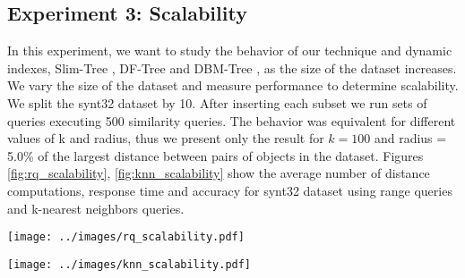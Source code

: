 \subsection{Experiment 3: Scalability}

In this experiment, we want to study the behavior of our technique and dynamic indexes, Slim-Tree \cite{SlimTree}, DF-Tree \cite{dftree} and DBM-Tree \cite{DBMTree}, as the size of the dataset increases. We vary the size of the dataset and measure performance to determine scalability.  We split the synt32 dataset by 10. After inserting each subset we run sets of queries executing 500 similarity queries. The behavior was equivalent for different values of k and radius, thus we present only the result for $k = 100$ and radius = 5.0\% of the largest distance between pairs of objects in the dataset. Figures \ref{fig:rq_scalability}, \ref{fig:knn_scalability} show  the average number of distance computations, response time and accuracy for synt32 dataset using range queries and k-nearest neighbors queries. 


\begin{figure*}[!t]
\centering
\texttt{[image: ../images/rq\_scalability.pdf]}
\caption{Comparison of range query (rQ) at 5.0\%. The average number of distance computations (first column), response time (second column) and accuracy (third column) is shown for \textit{synt32} dataset.}
\label{fig:rq_scalability}
\end{figure*}
\begin{figure*}[!t]
\centering
\texttt{[image: ../images/knn\_scalability.pdf]}
\caption{Comparison of 100-nearest neighbor query (kNNq). The average number of distance computations (first column), response time (second column) and accuracy (third column) is shown for \textit{synt32} dataset.}
\label{fig:knn_scalability}
\end{figure*}


